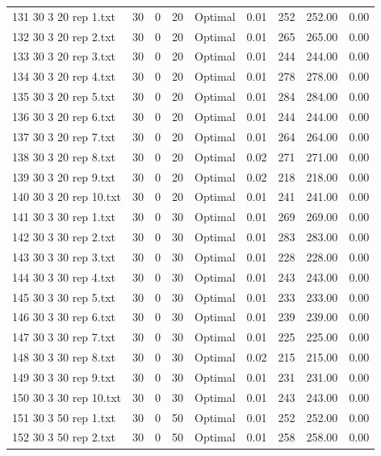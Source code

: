 \begin{longtable}{lrrllrrrr}
131 30 3 20 rep 1.txt & 30 & 0 & 20 & Optimal &  0.01 & 252 & 252.00 &  0.00\\
132 30 3 20 rep 2.txt & 30 & 0 & 20 & Optimal &  0.01 & 265 & 265.00 &  0.00\\
133 30 3 20 rep 3.txt & 30 & 0 & 20 & Optimal &  0.01 & 244 & 244.00 &  0.00\\
134 30 3 20 rep 4.txt & 30 & 0 & 20 & Optimal &  0.01 & 278 & 278.00 &  0.00\\
135 30 3 20 rep 5.txt & 30 & 0 & 20 & Optimal &  0.01 & 284 & 284.00 &  0.00\\
136 30 3 20 rep 6.txt & 30 & 0 & 20 & Optimal &  0.01 & 244 & 244.00 &  0.00\\
137 30 3 20 rep 7.txt & 30 & 0 & 20 & Optimal &  0.01 & 264 & 264.00 &  0.00\\
138 30 3 20 rep 8.txt & 30 & 0 & 20 & Optimal &  0.02 & 271 & 271.00 &  0.00\\
139 30 3 20 rep 9.txt & 30 & 0 & 20 & Optimal &  0.02 & 218 & 218.00 &  0.00\\
140 30 3 20 rep 10.txt & 30 & 0 & 20 & Optimal &  0.01 & 241 & 241.00 &  0.00\\
141 30 3 30 rep 1.txt & 30 & 0 & 30 & Optimal &  0.01 & 269 & 269.00 &  0.00\\
142 30 3 30 rep 2.txt & 30 & 0 & 30 & Optimal &  0.01 & 283 & 283.00 &  0.00\\
143 30 3 30 rep 3.txt & 30 & 0 & 30 & Optimal &  0.01 & 228 & 228.00 &  0.00\\
144 30 3 30 rep 4.txt & 30 & 0 & 30 & Optimal &  0.01 & 243 & 243.00 &  0.00\\
145 30 3 30 rep 5.txt & 30 & 0 & 30 & Optimal &  0.01 & 233 & 233.00 &  0.00\\
146 30 3 30 rep 6.txt & 30 & 0 & 30 & Optimal &  0.01 & 239 & 239.00 &  0.00\\
147 30 3 30 rep 7.txt & 30 & 0 & 30 & Optimal &  0.01 & 225 & 225.00 &  0.00\\
148 30 3 30 rep 8.txt & 30 & 0 & 30 & Optimal &  0.02 & 215 & 215.00 &  0.00\\
149 30 3 30 rep 9.txt & 30 & 0 & 30 & Optimal &  0.01 & 231 & 231.00 &  0.00\\
150 30 3 30 rep 10.txt & 30 & 0 & 30 & Optimal &  0.01 & 243 & 243.00 &  0.00\\
151 30 3 50 rep 1.txt & 30 & 0 & 50 & Optimal &  0.01 & 252 & 252.00 &  0.00\\
152 30 3 50 rep 2.txt & 30 & 0 & 50 & Optimal &  0.01 & 258 & 258.00 &  0.00\\

\end{longtable}
